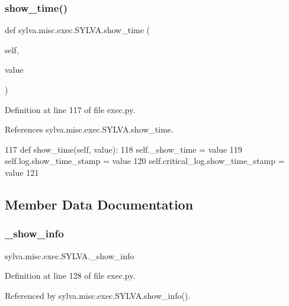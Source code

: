 \subsubsection{\texorpdfstring{show\+\_\+time()}{show\_time()}\hspace{0.1cm}{\footnotesize\ttfamily [2/2]}}
{\footnotesize\ttfamily def sylva.\+misc.\+exec.\+S\+Y\+L\+V\+A.\+show\+\_\+time (\begin{DoxyParamCaption}\item[{}]{self,  }\item[{}]{value }\end{DoxyParamCaption})}



Definition at line 117 of file exec.\+py.



References sylva.\+misc.\+exec.\+S\+Y\+L\+V\+A.\+show\+\_\+time.


\begin{DoxyCode}
117   \textcolor{keyword}{def }show\_time(self, value):
118     self.\_show\_time = value
119     self.log.show\_time\_stamp = value
120     self.critical\_log.show\_time\_stamp = value
121 
\end{DoxyCode}


\subsection{Member Data Documentation}
\mbox{\label{classsylva_1_1misc_1_1exec_1_1_s_y_l_v_a_a5bf958102447e938581ef6feca2068be}} 
\subsubsection{\texorpdfstring{\+\_\+show\+\_\+info}{\_show\_info}}
{\footnotesize\ttfamily sylva.\+misc.\+exec.\+S\+Y\+L\+V\+A.\+\_\+show\+\_\+info\hspace{0.3cm}{\ttfamily [private]}}



Definition at line 128 of file exec.\+py.



Referenced by sylva.\+misc.\+exec.\+S\+Y\+L\+V\+A.\+show\+\_\+info().

